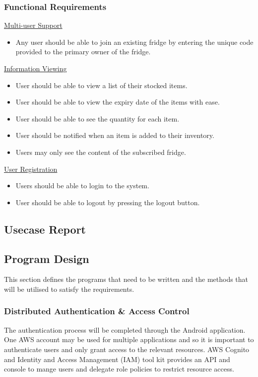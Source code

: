 \documentclass[a4paper, 11pt]{article}
\begin{document}
\subsubsection{Functional Requirements}
\underline{Multi-user Support}
\begin{itemize}
  \item Any user should be able to join an existing fridge by entering the unique code provided to the primary owner of the fridge.
\end{itemize}
\underline{Information Viewing}
\begin{itemize}
  \item User should be able to view a list of their stocked items.
  \item User should be able to view the expiry date of the items with ease. 
  \item User should be able to see the quantity for each item.
  \item User should be notified when an item is added to their inventory.
  \item Users may only see the content of the subscribed fridge.
\end{itemize}
\underline{User Registration}
\begin{itemize}
  \item Users should be able to login to the system. 
  \item User should be able to logout by pressing the logout button.
\end{itemize}


\subsection{Usecase Report}

\subsection{Program Design}
This section defines the programs that need to be written and the methods that will be utilised to satisfy the requirements.

\subsubsection{Distributed Authentication \& Access Control}
The authentication process will be completed through the Android application. One AWS account may be used for multiple applications and so it is important to authenticate users and only grant access to the relevant resources. AWS Cognito and Identity and Access Management (IAM) tool kit provides an API and console to mange users and delegate role policies to restrict resource access. 
\end{document}
